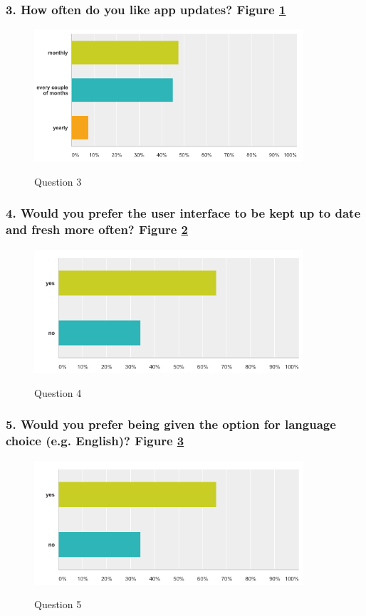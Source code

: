 \subsubsection{3. How often do you like app updates? Figure \ref{fig:label3}}

\begin{figure}[!h]
    \caption{Question 3}
    \centering
    \includegraphics[width=100mm]{images/survey/time}
    \label{fig:label3}
\end{figure}


\subsubsection{4. Would you prefer the user interface to be kept up to date and fresh more often? Figure \ref{fig:label4} }

\begin{figure}[!h]
    \caption{Question 4}
    \centering
    \includegraphics[width=100mm]{images/survey/updates}
    \label{fig:label4}
\end{figure}

\subsubsection{5. Would you prefer being given the option for language choice (e.g. English)? Figure \ref{fig:label5}}

\begin{figure}[!h]
    \caption{Question 5}
    \centering
    \includegraphics[width=100mm]{images/survey/language}
    \label{fig:label5}
\end{figure}


